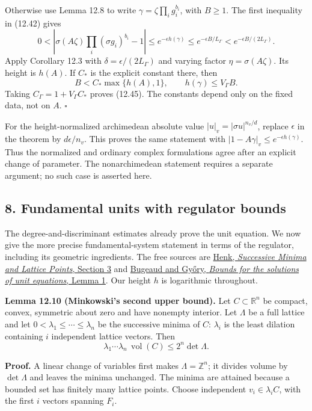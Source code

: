 \documentclass[
  11pt,
  a4paper,
]{article}
\newcounter{none} %
\begin{document}
Otherwise use Lemma 12.8 to write \(\gamma=\zeta\prod_i g_i^{b_i}\),
with \(B\ge1\). The first inequality in (12.42) gives \[
0<\left|\sigma(A\zeta)\prod_i(\sigma g_i)^{b_i}-1\right|
\le e^{-\epsilon h(\gamma)}
\le e^{-\epsilon B/L_\Gamma}
<e^{-\epsilon B/(2L_\Gamma)}.
\tag{12.46}
\] Apply Corollary 12.3 with \(\delta=\epsilon/(2L_\Gamma)\) and varying
factor \(\eta=\sigma(A\zeta)\). Its height is \(h(A)\). If \(C_*\) is
the explicit constant there, then \[
B<C_*\max\{h(A),1\},\qquad
h(\gamma)\le V_\Gamma B.
\] Taking \(C_\Gamma=1+V_\Gamma C_*\) proves (12.45). The constants
depend only on the fixed data, not on \(A\). \(\square\)

For the height-normalized archimedean absolute value
\(|u|_v=|\sigma u|^{n_v/d}\), replace \(\epsilon\) in the theorem by
\(d\epsilon/n_v\). This proves the same statement with
\(|1-A\gamma|_v\le e^{-\epsilon h(\gamma)}\). Thus the normalized and
ordinary complex formulations agree after an explicit change of
parameter. The nonarchimedean statement requires a separate argument; no
such case is asserted here.

\subsection{8. Fundamental units with regulator
bounds}\label{fundamental-units-with-regulator-bounds}

The degree-and-discriminant estimates already prove the unit equation.
We now give the more precise fundamental-system statement in terms of
the regulator, including its geometric ingredients. The free sources are
\href{https://arxiv.org/abs/math/0204158}{Henk, \emph{Successive Minima
and Lattice Points}, Section 3} and
\href{https://matwbn.icm.edu.pl/ksiazki/aa/aa74/aa7416.pdf}{Bugeaud and
Győry, \emph{Bounds for the solutions of unit equations}, Lemma 1}. Our
height \(h\) is logarithmic throughout.

\textbf{Lemma 12.10 (Minkowski's second upper bound).} Let
\(C\subset\mathbb R^n\) be compact, convex, symmetric about zero and
have nonempty interior. Let \(\Lambda\) be a full lattice and let
\(0<\lambda_1\le\cdots\le\lambda_n\) be the successive minima of \(C\):
\(\lambda_i\) is the least dilation containing \(i\) independent lattice
vectors. Then \[
\lambda_1\cdots\lambda_n\,\operatorname{vol}(C)
\le 2^n\det\Lambda.
\tag{12.47}
\]

\textbf{Proof.} A linear change of variables first makes
\(\Lambda=\mathbb Z^n\); it divides volume by \(\det\Lambda\) and leaves
the minima unchanged. The minima are attained because a bounded set has
finitely many lattice points. Choose independent \(v_i\in\lambda_i C\),
with the first \(i\) vectors spanning \(F_i\).
\end{document}
